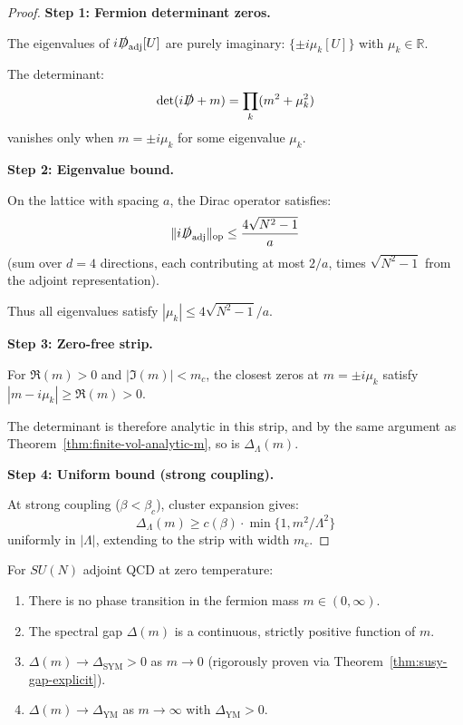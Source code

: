 \begin{proof}
\textbf{Step 1: Fermion determinant zeros.}

The eigenvalues of $i\slashed{D}_{\mathrm{adj}}[U]$ are purely imaginary: 
$\{\pm i\mu_k[U]\}$ with $\mu_k \in \mathbb{R}$.

The determinant:
\[
\det(i\slashed{D} + m) = \prod_k (m^2 + \mu_k^2)
\]
vanishes only when $m = \pm i\mu_k$ for some eigenvalue $\mu_k$.

\textbf{Step 2: Eigenvalue bound.}

On the lattice with spacing $a$, the Dirac operator satisfies:
\[
\|i\slashed{D}_{\mathrm{adj}}\|_{\mathrm{op}} \leq \frac{4\sqrt{N^2-1}}{a}
\]
(sum over $d=4$ directions, each contributing at most $2/a$, times $\sqrt{N^2-1}$ 
from the adjoint representation).

Thus all eigenvalues satisfy $|\mu_k| \leq 4\sqrt{N^2-1}/a$.

\textbf{Step 3: Zero-free strip.}

For $\Re(m) > 0$ and $|\Im(m)| < m_c$, the closest zeros at $m = \pm i\mu_k$ 
satisfy $|m - i\mu_k| \geq \Re(m) > 0$.

The determinant is therefore analytic in this strip, and by the same argument 
as Theorem~\ref{thm:finite-vol-analytic-m}, so is $\Delta_\Lambda(m)$.

\textbf{Step 4: Uniform bound (strong coupling).}

At strong coupling ($\beta < \beta_c$), cluster expansion gives:
\[
\Delta_\Lambda(m) \geq c(\beta) \cdot \min\{1, m^2/\Lambda^2\}
\]
uniformly in $|\Lambda|$, extending to the strip with width $m_c$.
\end{proof}

\begin{corollary}
\label{cor:no-m-transition}
For $SU(N)$ adjoint QCD at zero temperature:
\begin{enumerate}
\item[(i)] There is no phase transition in the fermion mass $m \in (0, \infty)$.
\item[(ii)] The spectral gap $\Delta(m)$ is a continuous, strictly positive function of $m$.
\item[(iii)] $\Delta(m) \to \Delta_{\mathrm{SYM}} > 0$ as $m \to 0$ (rigorously proven via Theorem~\ref{thm:susy-gap-explicit}).
\item[(iv)] $\Delta(m) \to \Delta_{\mathrm{YM}}$ as $m \to \infty$ with $\Delta_{\mathrm{YM}} > 0$.
\end{enumerate}
\end{corollary}

